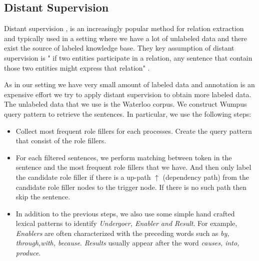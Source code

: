 
\subsection{Distant Supervision}
Distant supervision \cite{mintz2009distant},  is an increasingly popular method for relation extraction and typically used in a setting where we have a lot  of unlabeled data and there exist the source of  labeled knowledge base.
They key assumption of distant supervision is " if two entities participate in a relation, any sentence that contain those two entities might express that relation" \cite{mintz2009distant}. 

As in our setting we have very small amount of labeled data and annotation is an expensive effort we try to apply distant supervision to obtain more labeled data. The unlabeled data that we use is the Waterloo corpus. We construct Wumpus query pattern to retrieve the sentences. In particular, we use the following steps:
\begin{itemize}[noitemsep,nolistsep]
\item Collect most frequent role fillers for each processes.  Create the  query pattern that consist of the role fillers.
\item  For each filtered sentences, we perform matching between token in the sentence and the most frequent role fillers that we have. And then only label the candidate role filler if there is a   up-path $\uparrow$ (dependency path) from the candidate role filler nodes to the trigger node. If there is no such path then skip the sentence.
\item In addition to the previous steps, we also use some simple hand crafted  lexical patterns  to identify \textit{Undergoer, Enabler and Result}.   For example, \textit{Enablers} are often characterized with the preceding words such as \textit{by, through,with, because}. \textit{Results} usually appear after the word \textit{causes, into, produce}. 
\end{itemize}